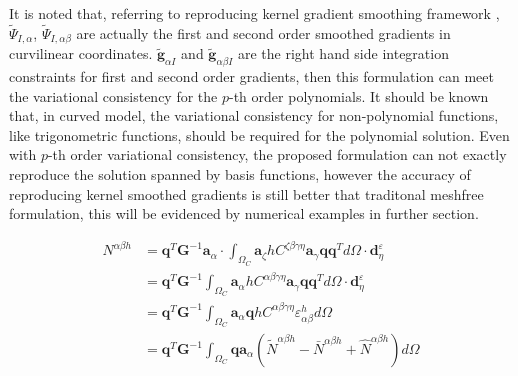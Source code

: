 It is noted that, referring to reproducing kernel gradient smoothing framework \cite{wang2019d}, $\tilde \Psi_{I,\alpha}$, $\tilde \Psi_{I,\alpha\beta}$ are actually the first and second order smoothed gradients in curvilinear coordinates. $\tilde{\boldsymbol g}_{\alpha I}$ and $\tilde{\boldsymbol g}_{\alpha \beta I}$ are the right hand side integration constraints for first and second order gradients, then this formulation can meet the variational consistency for the $p$-th order polynomials. It should be known that, in curved model, the variational consistency for non-polynomial functions, like trigonometric functions, should be required for the polynomial solution. Even with $p$-th order variational consistency, the proposed formulation can not exactly reproduce the solution spanned by basis functions, however the accuracy of reproducing kernel smoothed gradients is still better that traditonal meshfree formulation, this will be evidenced by numerical examples in further section.

\begin{equation}
\begin{split}
N^{\alpha\beta h} &= \boldsymbol q^T \boldsymbol G^{-1} \boldsymbol a_\alpha \cdot \int_{\Omega_C} \boldsymbol a_{\zeta} hC^{\zeta\beta\gamma\eta} \boldsymbol a_\gamma \boldsymbol q \boldsymbol q^T d\Omega \cdot \boldsymbol d^\varepsilon_\eta \\
&= \boldsymbol q^T \boldsymbol G^{-1} \int_{\Omega_C} \boldsymbol a_{\alpha} hC^{\alpha\beta\gamma\eta} \boldsymbol a_\gamma \boldsymbol q \boldsymbol q^T d\Omega \cdot \boldsymbol d^\varepsilon_\eta \\
&= \boldsymbol q^T \boldsymbol G^{-1} \int_{\Omega_C} \boldsymbol a_{\alpha} \boldsymbol q hC^{\alpha\beta\gamma\eta} \varepsilon^h_{\alpha\beta} d\Omega \\
&= \boldsymbol q^T \boldsymbol G^{-1} \int_{\Omega_C} \boldsymbol q \boldsymbol a_{\alpha} (\tilde N^{\alpha\beta h} - \bar N^{\alpha\beta h} + \hat N^{\alpha\beta h}) d\Omega \\
\end{split}
\end{equation}
